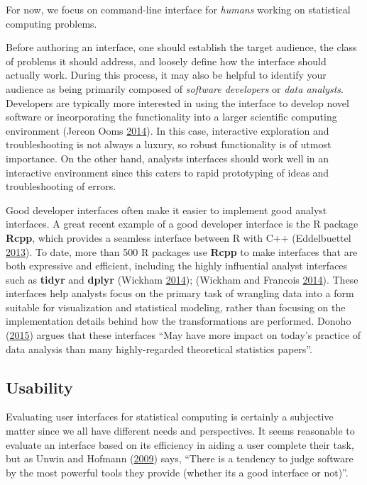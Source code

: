 \documentclass[12pt,]{isuthesis}
\begin{document}
For now, we focus on command-line interface for \emph{humans} working on
statistical computing problems.

Before authoring an interface, one should establish the target audience,
the class of problems it should address, and loosely define how the
interface should actually work. During this process, it may also be
helpful to identify your audience as being primarily composed of
\emph{software developers} or \emph{data analysts}. Developers are
typically more interested in using the interface to develop novel
software or incorporating the functionality into a larger scientific
computing environment (Jereon Ooms
\protect\hyperlink{ref-embedded-computing}{2014}). In this case,
interactive exploration and troubleshooting is not always a luxury, so
robust functionality is of utmost importance. On the other hand,
analysts interfaces should work well in an interactive environment since
this caters to rapid prototyping of ideas and troubleshooting of errors.

Good developer interfaces often make it easier to implement good analyst
interfaces. A great recent example of a good developer interface is the
R package \textbf{Rcpp}, which provides a seamless interface between R
with C++ (Eddelbuettel \protect\hyperlink{ref-Rcpp}{2013}). To date,
more than 500 R packages use \textbf{Rcpp} to make interfaces that are
both expressive and efficient, including the highly influential analyst
interfaces such as \textbf{tidyr} and \textbf{dplyr} (Wickham
\protect\hyperlink{ref-tidy-data}{2014}); (Wickham and Francois
\protect\hyperlink{ref-dplyr}{2014}). These interfaces help analysts
focus on the primary task of wrangling data into a form suitable for
visualization and statistical modeling, rather than focusing on the
implementation details behind how the transformations are performed.
Donoho (\protect\hyperlink{ref-Donoho:2015tu}{2015}) argues that these
interfaces ``May have more impact on today's practice of data analysis
than many highly-regarded theoretical statistics papers''.

\subsection{Usability}\label{usability}

Evaluating user interfaces for statistical computing is certainly a
subjective matter since we all have different needs and perspectives. It
seems reasonable to evaluate an interface based on its efficiency in
aiding a user complete their task, but as Unwin and Hofmann
(\protect\hyperlink{ref-Unwin:1999vp}{2009}) says, ``There is a tendency
to judge software by the most powerful tools they provide (whether its a
good interface or not)''.
\end{document}
